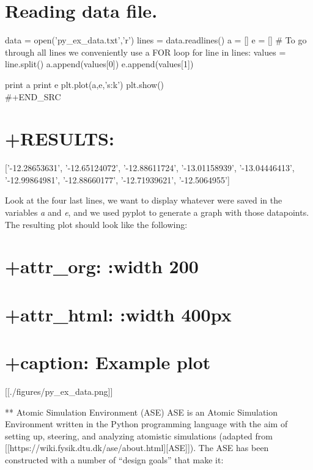 \documentclass[11pt]{article}
\providecommand{\tightlist}{%
      \setlength{\itemsep}{0pt}\setlength{\parskip}{0pt}}
\begin{document}
\section{Reading data file.}\label{reading-data-file.}

data = open('py\_ex\_data.txt','r') lines = data.readlines() a = {[}{]}
e = {[}{]} \# To go through all lines we conveniently use a FOR loop for
line in lines: values = line.split() a.append(values{[}0{]})
e.append(values{[}1{]})

print a print e plt.plot(a,e,'s:k') plt.show()\\
\#+END\_SRC

\section{+RESULTS:}\label{results-10}

\begin{description}
\tightlist
\item[: {[}'3.8', '3.85', '3.9', '3.95', '4', '4.05', '4.1', '4.15',
'4.2'{]}]
{[}'-12.28653631', '-12.65124072', '-12.88611724', '-13.01158939',
'-13.04446413', '-12.99864981', '-12.88660177', '-12.71939621',
'-12.5064955'{]}
\end{description}

Look at the four last lines, we want to display whatever were saved in
the variables \emph{a} and \emph{e}, and we used pyplot to generate a
graph with those datapoints. The resulting plot should look like the
following:

\section{+attr\_org: :width 200}\label{attr_org-width-200-1}

\section{+attr\_html: :width 400px}\label{attr_html-width-400px}

\section{+caption: Example plot}\label{caption-example-plot}

{[}{[}./figures/py\_ex\_data.png{]}{]}

** Atomic Simulation Environment (ASE) ASE is an Atomic Simulation
Environment written in the Python programming language with the aim of
setting up, steering, and analyzing atomistic simulations (adapted from
{[}{[}https://wiki.fysik.dtu.dk/ase/about.html{]}{[}ASE{]}{]}). The ASE
has been constructed with a number of ``design goals'' that make it:
\end{document}
